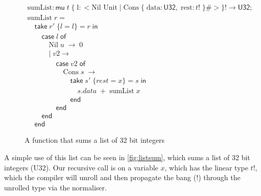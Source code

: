 \begin{figure}
    \centering
    \[
        \begin{array}{l}
            \text{sumList} : \textsf{mu}\; t\; \{\; \text{l}: < \text{Nil Unit}\; |\; \text{Cons}\; \{\; \text{data}: \textsf{U32},\; \text{rest}: t!\; \}\# >\}!
                \rightarrow \textsf{U32}; \\
            \text{sumList}\; r = \\
            \hspace{1em}    \textsf{take}\; r'\; \{ l = l \} = r\; \textsf{in}  \\
            \hspace{2em}    \textsf{case}\; l\; \textsf{of} \\
            \hspace{3em}        \text{Nil}\; u\; \rightarrow\; 0 \\
            \hspace{3em}    |\; v2 \rightarrow \\
            \hspace{4em}    \textsf{case}\; v2\; \textsf{of} \\
            \hspace{5em}    \text{Cons}\; s\; \rightarrow  \\
            \hspace{6em}    \textsf{take}\; s'\; \{ rest = x \} = s\; \textsf{in} \hspace{2em} \\
            \hspace{7em}        s.data\; +\; \text{sumList}\; x \\
            \hspace{6em}    \textsf{end} \\
            \hspace{4em}    \textsf{end} \\
            \hspace{2em}    \textsf{end} \\
            \hspace{1em}    \textsf{end}
        \end{array}
    \]
    
    \caption{A function that sums a list of 32 bit integers}
    \label{fig:listsum}
\end{figure}

A simple use of this list can be seen in \autoref{fig:listsum}, which sums a list of
32 bit integers (\textsf{U32}). Our recursive call is on a variable $x$, which has
the linear type $t!$, which the compiler will unroll and then propagate the bang ($!$)
through the unrolled type via the normaliser.

